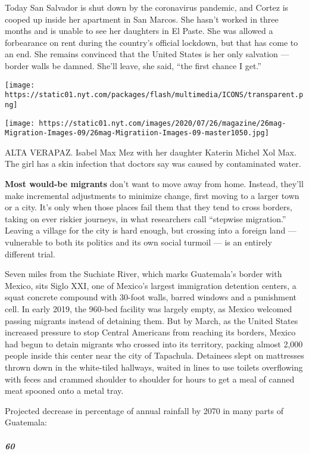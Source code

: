 Today San Salvador is shut down by the coronavirus pandemic, and Cortez
is cooped up inside her apartment in San Marcos. She hasn't worked in
three months and is unable to see her daughters in El Paste. She was
allowed a forbearance on rent during the country's official lockdown,
but that has come to an end. She remains convinced that the United
States is her only salvation --- border walls be damned. She'll leave,
she said, ``the first chance I get.''

\texttt{[image: https://static01.nyt.com/packages/flash/multimedia/ICONS/transparent.png]}

\texttt{[image: https://static01.nyt.com/images/2020/07/26/magazine/26mag-Migration-Images-09/26mag-Migratiion-Images-09-master1050.jpg]}

ALTA VERAPAZ. Isabel Max Mez with her daughter Katerin Michel Xol Max.
The girl has a skin infection that doctors say was caused by
contaminated water.

\textbf{Most would-be migrants} don't want to move away from home.
Instead, they'll make incremental adjustments to minimize change, first
moving to a larger town or a city. It's only when those places fail them
that they tend to cross borders, taking on ever riskier journeys, in
what researchers call ``stepwise migration.'' Leaving a village for the
city is hard enough, but crossing into a foreign land --- vulnerable to
both its politics and its own social turmoil --- is an entirely
different trial.

Seven miles from the Suchiate River, which marks Guatemala's border with
Mexico, sits Siglo XXI, one of Mexico's largest immigration detention
centers, a squat concrete compound with 30-foot walls, barred windows
and a punishment cell. In early 2019, the 960-bed facility was largely
empty, as Mexico welcomed passing migrants instead of detaining them.
But by March, as the United States increased pressure to stop Central
Americans from reaching its borders, Mexico had begun to detain migrants
who crossed into its territory, packing almost 2,000 people inside this
center near the city of Tapachula. Detainees slept on mattresses thrown
down in the white-tiled hallways, waited in lines to use toilets
overflowing with feces and crammed shoulder to shoulder for hours to get
a meal of canned meat spooned onto a metal tray.

Projected decrease in percentage of annual rainfall by 2070 in many
parts of Guatemala:

\hypertarget{60}{%
\subparagraph{60}\label{60}}

